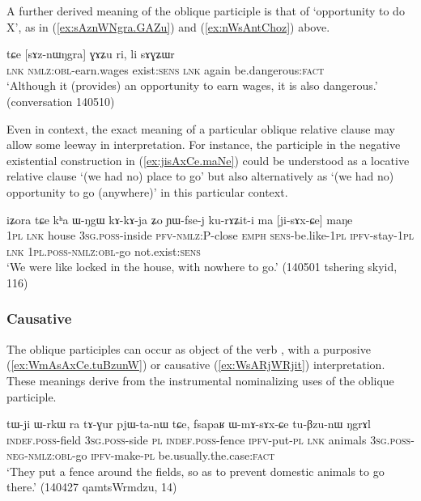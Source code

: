 A further derived meaning of the oblique participle is that of `opportunity to do X', as in (\ref{ex:sAznWNgra.GAZu}) and (\ref{ex:nWsAntChoz}) above.

\begin{exe}
\ex \label{ex:sAznWNgra.GAZu}
\gll tɕe [sɤz-nɯŋgra] ɣɤʑu ri, li sɤɣʑɯr \\
\textsc{lnk} \textsc{nmlz}:\textsc{obl}-earn.wages exist:\textsc{sens} \textsc{lnk} again be.dangerous:\textsc{fact} \\
\glt `Although it (provides) an opportunity to earn wages, it is also dangerous.' (conversation 140510)
\end{exe}


Even in context, the exact meaning of a particular oblique relative clause may allow some leeway in interpretation. For instance, the participle  in the negative existential construction in (\ref{ex:jisAxCe.maNe}) could be understood as a locative relative clause `(we had no) place to go' but also alternatively as `(we had no) opportunity to go (anywhere)' in this particular context.

\begin{exe}
\ex \label{ex:jisAxCe.maNe}
\gll  iʑora tɕe kʰa ɯ-ŋgɯ kɤ-kɤ-ja ʑo ɲɯ-fse-j ku-rɤʑit-i ma [ji-sɤx-ɕe] maŋe \\
\textsc{1pl} \textsc{lnk} house \textsc{3sg}.\textsc{poss}-inside \textsc{pfv}-\textsc{nmlz}:P-close \textsc{emph} \textsc{sens}-be.like-\textsc{1pl} \textsc{ipfv}-stay-\textsc{1pl} \textsc{lnk} \textsc{1pl}.\textsc{poss}-\textsc{nmlz}:\textsc{obl}-go not.exist:\textsc{sens} \\
\glt  `We were like locked in the house, with nowhere to go.' (140501 tshering skyid, 116)
\end{exe}

\subsubsection{Causative} \label{sec:oblique.participle.causative}
The oblique participles can occur as object of the verb , with a purposive (\ref{ex:WmAsAxCe.tuBzunW}) or causative (\ref{ex:WsARjWRjit}) interpretation. These meanings derive from the instrumental nominalizing uses of the oblique participle. 

\begin{exe}
\ex \label{ex:WmAsAxCe.tuBzunW}
\gll tɯ-ji ɯ-rkɯ ra tɤ-ɣur pjɯ-ta-nɯ tɕe, fsapaʁ ɯ-mɤ-sɤx-ɕe tu-βzu-nɯ ŋgrɤl \\
\textsc{indef}.\textsc{poss}-field \textsc{3sg}.\textsc{poss}-side \textsc{pl} \textsc{indef}.\textsc{poss}-fence \textsc{ipfv}-put-\textsc{pl} \textsc{lnk} animals \textsc{3sg}.\textsc{poss}-\textsc{neg}-\textsc{nmlz}:\textsc{obl}-go \textsc{ipfv}-make-\textsc{pl} be.usually.the.case:\textsc{fact} \\
\glt `They put a fence around the fields, so as to prevent domestic animals to go there.' (140427 qamtsWrmdzu, 14)
\end{exe}


